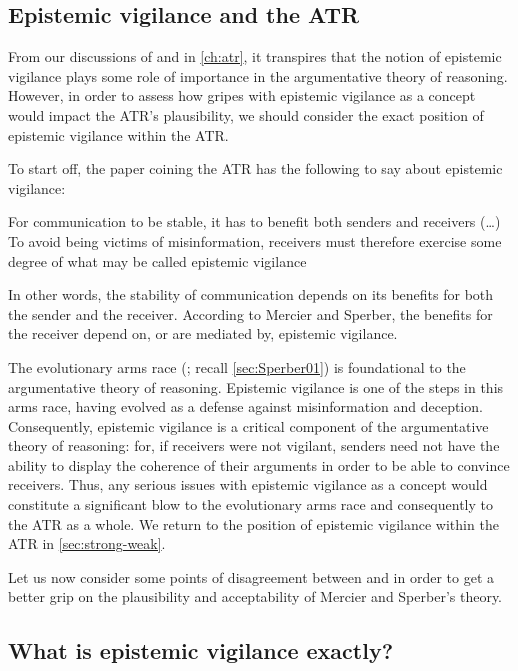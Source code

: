 \subsection{Epistemic vigilance and the ATR}
\label{sec:epi-vigil-atr}

From our discussions of \citet{Sperber10} and \citet{MS11} in \cref{ch:atr}, it transpires that the notion of epistemic vigilance plays some role of importance in the argumentative theory of reasoning. However, in order to assess how gripes with epistemic vigilance as a concept would impact the ATR's plausibility, we should consider the exact position of epistemic vigilance within the ATR.

To start off, the paper coining the ATR has the following to say about epistemic vigilance:

\begin{quoting}
    For communication to be stable, it has to benefit both senders and receivers (\ldots) To avoid being victims of misinformation, receivers must therefore exercise some degree of what may be called epistemic vigilance
\end{quoting}
In other words, the stability of communication depends on its benefits for both the sender and the receiver. According to Mercier and Sperber, the benefits for the receiver depend on, or are mediated by, epistemic vigilance.

The evolutionary arms race (\citealp{Sperber01}; recall \cref{sec:Sperber01}) is foundational to the argumentative theory of reasoning. Epistemic vigilance is one of the steps in this arms race, having evolved as a defense against misinformation and deception. Consequently, epistemic vigilance is a critical component of the argumentative theory of reasoning: for, if receivers were not vigilant, senders need not have the ability to display the coherence of their arguments in order to be able to convince receivers. Thus, any serious issues with epistemic vigilance as a concept would constitute a significant blow to the evolutionary arms race and consequently to the ATR as a whole. We return to the position of epistemic vigilance within the ATR in \cref{sec:strong-weak}.

Let us now consider some points of disagreement between \citet{Michaelian13} and \citet{Sperber10} in order to get a better grip on the plausibility and acceptability of Mercier and Sperber's theory.

\subsection{What is epistemic vigilance exactly?}
\label{sec:EV-def}

